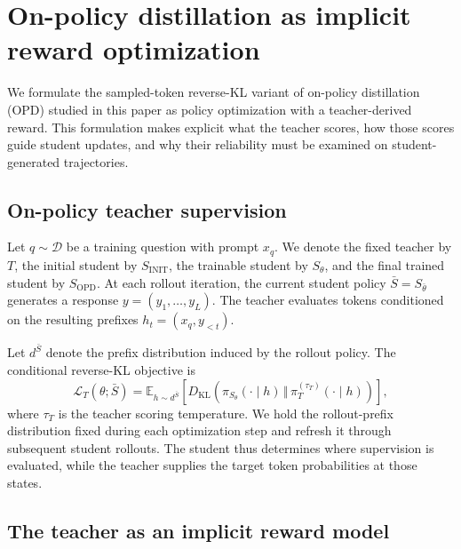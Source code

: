 
\section{On-policy distillation as implicit reward optimization}
\label{sec:opd-implicit-reward}

We formulate the sampled-token reverse-KL variant of on-policy distillation (OPD) studied in this paper as policy optimization with a teacher-derived reward.
This formulation makes explicit what the teacher scores, how those scores guide student updates, and why their reliability must be examined on student-generated trajectories.

\subsection{On-policy teacher supervision}
\label{sec:opd-supervision}

Let $q\sim\mathcal{D}$ be a training question with prompt $x_q$. We denote the fixed teacher by $T$, the initial student by $S_{\mathrm{INIT}}$, the trainable student by $S_\theta$, and the final trained student by $S_{\mathrm{OPD}}$. At each rollout iteration, the current student policy $\bar S=S_{\bar\theta}$ generates a response $y=(y_1,\ldots,y_L)$. The teacher evaluates tokens conditioned on the resulting prefixes $h_t=(x_q,y_{<t})$.

Let $d^{\bar S}$ denote the prefix distribution induced by the rollout policy. The conditional reverse-KL objective is
\begin{equation}
\mathcal{L}_T(\theta;\bar S)
=
\mathbb{E}_{h\sim d^{\bar S}}\!\left[
D_{\mathrm{KL}}\!\left(
\pi_{S_\theta}(\cdot\mid h)
\,\Vert\,
\pi_T^{(\tau_T)}(\cdot\mid h)
\right)
\right],
\label{eq:opd-conditional-kl}
\end{equation}
where $\tau_T$ is the teacher scoring temperature. We hold the rollout-prefix distribution fixed during each optimization step and refresh it through subsequent student rollouts. The student thus determines where supervision is evaluated, while the teacher supplies the target token probabilities at those states.

\subsection{The teacher as an implicit reward model}
\label{sec:opd-reward}

